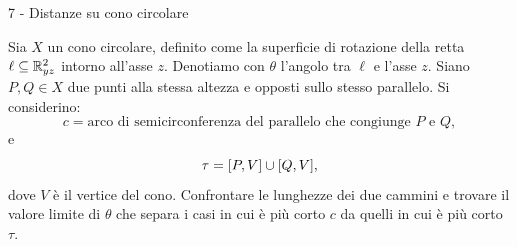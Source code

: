 \documentclass[a4paper]{article}
\begin{document}
\begin{snippetexercise}{7 - Distanze su cono circolare}
    \begin{figure}
        \centering
    \end{figure}
    Sia \(X\) un cono circolare, definito come la superficie di
    rotazione della retta \(\ell\subseteq\mathbb{R}^2_{yz}\) intorno
    all'asse \(z\). Denotiamo con \(\theta\) l'angolo tra \(\ell\) e
    l'asse \(z\).
    Siano \(P,Q\in X\) due punti alla stessa altezza e opposti sullo
    stesso parallelo. Si considerino:
    \[
        c = \text{arco di semicirconferenza del parallelo che congiunge } P
        \text{ e } Q,
    \]
    e
    \[
        \tau=[P,V]\cup[Q,V],
    \]
    dove \(V\) è il vertice del cono.
    Confrontare le lunghezze dei due cammini e trovare il valore limite
    di \(\theta\) che separa i casi in cui è più corto \(c\) da quelli in
    cui è più corto \(\tau\). \wrapfill
\end{snippetexercise}
\end{document}
